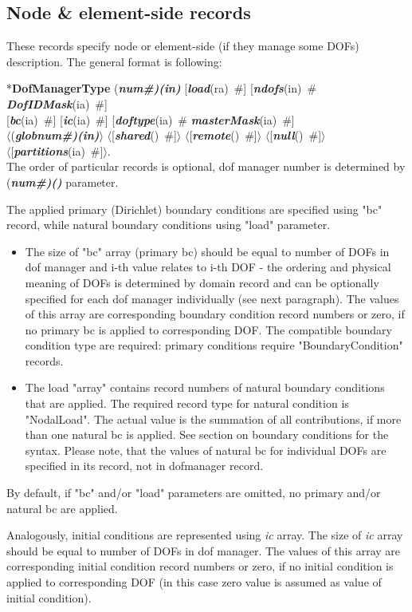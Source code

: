\documentclass[draft]{article}
\newcommand{\param}[1]{{\em #1}}
\newcommand{\fieldVal}[2]{\mbox{({\it\bf{#1}\#)\tiny (#2)}}}
\newcommand{\keywordnotype}[1]{\mbox{{\it{\bf{#1}}}}}
\newcommand{\keyword}[2]{\mbox{{\keywordnotype{#1}\tiny (#2)}}}
\newcommand{\entKeyword}[1]{\mbox{{*{\bf{#1}}}}}
\newcommand{\field}[2]{\mbox{\keyword{#1}{#2}~\#}}
\newcommand{\optField}[2]{\mbox{[\field{#1}{#2}]}}
\newcommand{\PfieldVal}[2]{\mbox{$\langle$({\it\bf{#1}\#)\tiny (#2)}$\rangle$}}
\newcommand{\PoptField}[2]{\mbox{$\langle$[\field{#1}{#2}]$\rangle$}}
\begin{document}
\subsection{Node \& element-side records}
\label{_NodeElementSideRecords}
These records specify node or element-side (if they manage some DOFs) description. The general format is
following:

\noindent
\entKeyword{DofManagerType} \fieldVal{num}{in}
[\field{load}{ra}] [\field{ndofs}{in}
\field{DofIDMask}{ia}]\\
\optField{bc}{ia}
\optField{ic}{ia} [\field{doftype}{ia} \field{masterMask}{ia}] \\ \PfieldVal{globnum}{in}
\PoptField{shared}{} \PoptField{remote}{} \PoptField{null}{}\\
 \PoptField{partitions}{ia}.\\

The order of particular records is optional, dof manager number is determined by \fieldVal{num}{} parameter. 

The applied primary (Dirichlet) boundary conditions are specified using
"bc" record, while natural boundary conditions using "load" parameter.
\begin{itemize}
\item The size of "bc" array (primary bc) should be equal to number of DOFs in dof manager and i-th value relates to i-th DOF - the ordering and physical meaning of DOFs is determined by domain record and can be optionally specified for each dof manager individually (see next paragraph). The values of this array are corresponding boundary condition record numbers or zero, if no primary bc is applied to corresponding DOF. The compatible boundary condition type are required: primary conditions require "BoundaryCondition" records.
\item The load "array" contains record numbers of natural boundary conditions that are applied. The required record type for natural condition is "NodalLoad". The actual value is the summation of all contributions, if more than one natural bc is applied. See section on boundary conditions for the syntax. Please note, that the values of natural bc for individual DOFs are specified in its record, not in dofmanager record.
\end{itemize}

By default, if "bc" and/or "load" parameters are omitted, no primary
and/or natural bc are applied.

Analogously, initial conditions are represented using \param{ic} array. The size of \param{ic} array should be equal to number of DOFs in dof manager. The values of this array are corresponding initial condition record numbers or zero, if no initial condition is applied to corresponding DOF (in this case zero value is assumed as value of initial condition).
\end{document}
